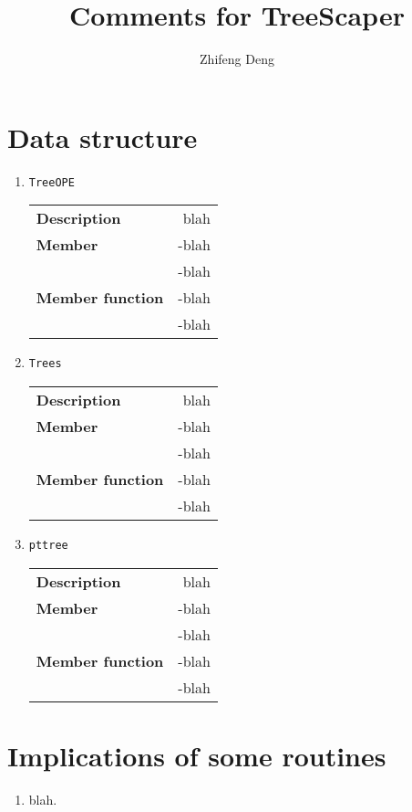 \documentclass[11pt,a4paper]{article}
\title{Comments for TreeScaper}
\author{Zhifeng Deng}
\theoremstyle{definition}
\theoremstyle{definition}
\theoremstyle{proposition}
\theoremstyle{theorem}
\theoremstyle{corollary}
\theoremstyle{lemma}
\numberwithin{equation}{section}
\begin{document}
	\maketitle
	
	\section*{Data structure}
	
	\begin{enumerate}[label=\arabic*]
		\item \texttt{TreeOPE}
		
		\begin{table}[!h]
			\begin{tabular}{>{\bfseries}lr}
				Description & blah\\
				Member & -blah\\
				& -blah\\
				Member function& -blah\\
				& -blah
			\end{tabular}
		\end{table}
		\item \texttt{Trees}
		
		\begin{table}[!h]
			\begin{tabular}{>{\bfseries}lr}
				Description & blah\\
				Member & -blah\\
				& -blah\\
				Member function& -blah\\
				& -blah
			\end{tabular}
		\end{table}
	
		\item \texttt{pttree}
		
		\begin{table}[!h]
			\begin{tabular}{>{\bfseries}lr}
				Description & blah\\
				Member & -blah\\
				& -blah\\
				Member function& -blah\\
				& -blah
			\end{tabular}
		\end{table}
	\end{enumerate}

	
	\section*{Implications of some routines}
	
	\begin{enumerate}
		\item blah.
		
	\end{enumerate}
	
	
	
\end{document}
